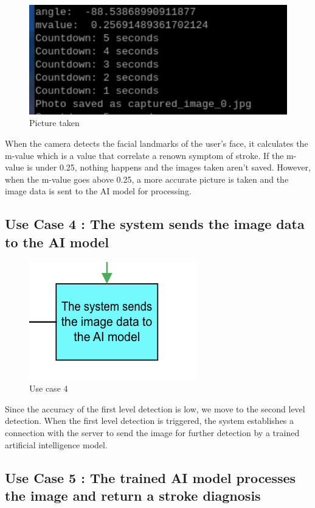 \begin{figure}[H]
    \centering
    \includegraphics[width=0.7\linewidth]{images/Take picture.png}
    \caption{Picture taken}
    \label{fig:picture taken}
\end{figure}

When the camera detects the facial landmarks of the user's face, it calculates the m-value which is a value that correlate a renown symptom of stroke. If the m-value is under 0.25, nothing happens and the images taken aren't saved. However, when the m-value goes above 0.25, a more accurate picture is taken and the image data is sent to the AI model for processing.

\subsection{\textbf{Use Case 4 : The system sends the image data to the AI model}}

\begin{figure}[H]
    \centering
    \includegraphics[width=0.33\linewidth]{images/use_case4.png}
    \caption{Use case 4}
    \label{fig:use_case4}
\end{figure}

Since the accuracy of the first level detection is low, we move to the second level detection. When the first level detection is triggered, the system establishes a connection with the server to send the image for further detection by a trained artificial intelligence model.

\subsection{\textbf{Use Case 5 : The trained AI model processes the image and return a stroke diagnosis}}

